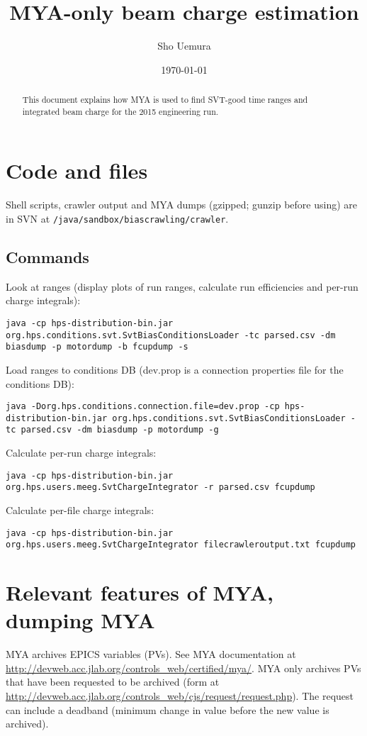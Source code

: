\documentclass[aps,amsmath,amssymb,notitlepage,11pt,onecolumn]{revtex4-1}
\begin{document}

\title{MYA-only beam charge estimation}
\author{Sho Uemura}
\date{\today}
\begin{abstract}
    This document explains how MYA is used to find SVT-good time ranges and integrated beam charge for the 2015 engineering run.
\end{abstract}
\maketitle

\section{Code and files}

Shell scripts, crawler output and MYA dumps (gzipped; gunzip before using) are in SVN at \texttt{/java/sandbox/biascrawling/crawler}.


\subsection{Commands}
Look at ranges (display plots of run ranges, calculate run efficiencies and per-run charge integrals):

\texttt{java -cp hps-distribution-bin.jar org.hps.conditions.svt.SvtBiasConditionsLoader -tc parsed.csv -dm biasdump -p motordump -b fcupdump -s}

Load ranges to conditions DB (dev.prop is a connection properties file for the conditions DB):

\texttt{java -Dorg.hps.conditions.connection.file=dev.prop -cp hps-distribution-bin.jar org.hps.conditions.svt.SvtBiasConditionsLoader -tc parsed.csv -dm biasdump -p motordump -g}

Calculate per-run charge integrals:

\texttt{java -cp hps-distribution-bin.jar org.hps.users.meeg.SvtChargeIntegrator -r parsed.csv fcupdump}

Calculate per-file charge integrals:

\texttt{java -cp hps-distribution-bin.jar org.hps.users.meeg.SvtChargeIntegrator filecrawleroutput.txt fcupdump}
\section{Relevant features of MYA, dumping MYA}
MYA archives EPICS variables (PVs).
See MYA documentation at \url{http://devweb.acc.jlab.org/controls_web/certified/mya/}.
MYA only archives PVs that have been requested to be archived (form at \url{http://devweb.acc.jlab.org/controls_web/cjs/request/request.php}).
The request can include a deadband (minimum change in value before the new value is archived).
\end{document}
